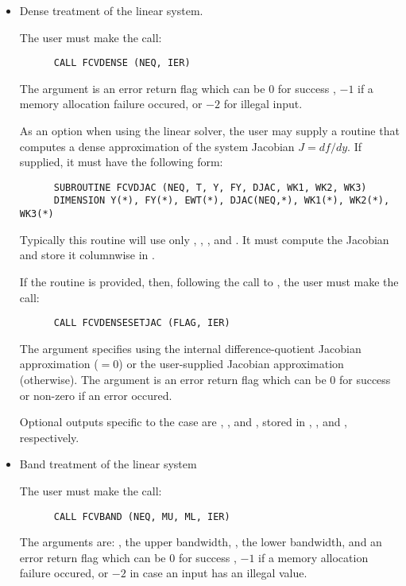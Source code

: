 \begin{Steps}
\begin{itemize}
  \item {\s} Dense treatment of the linear system.

    The user must make the call:
\begin{verbatim}
      CALL FCVDENSE (NEQ, IER)
\end{verbatim}
    The argument  is an error return flag which can be $0$ 
    for success , $-1$ if a memory allocation failure occured, or $-2$ for illegal input. 
    
    As an option when using the {\dense} linear solver, the user may supply a
    routine that computes a dense approximation of the system Jacobian 
    $J = df/dy$. If supplied, it must have the following form:
\begin{verbatim}
      SUBROUTINE FCVDJAC (NEQ, T, Y, FY, DJAC, WK1, WK2, WK3)
      DIMENSION Y(*), FY(*), EWT(*), DJAC(NEQ,*), WK1(*), WK2(*), WK3(*)
\end{verbatim}
    Typically this routine will use only , , , and . 
    It must compute the Jacobian and store it columnwise in .

    If the  routine is provided, then, 
    following the call to , the user must make the call:
\begin{verbatim}
      CALL FCVDENSESETJAC (FLAG, IER)
\end{verbatim}
    The argument  specifies using the {\cvode} internal difference-quotient 
    Jacobian approximation ($=0$) or the user-supplied Jacobian approximation
    (otherwise). The argument  is an error return flag which can be $0$ 
    for success or non-zero if an error occured.

    Optional outputs specific to the {\dense} case are , , and ,
    stored in , , and , respectively.
    
  \item {\s}    Band treatment of the linear system

    The user must make the call:
\begin{verbatim}
      CALL FCVBAND (NEQ, MU, ML, IER)
\end{verbatim}
    The arguments are: , the upper bandwidth, , 
    the lower bandwidth, and  an error return flag which can be  
    $0$ for success , $-1$ if a memory allocation failure occured, or $-2$ 
    in case an input has an illegal value.     


\end{itemize}
\end{Steps}
